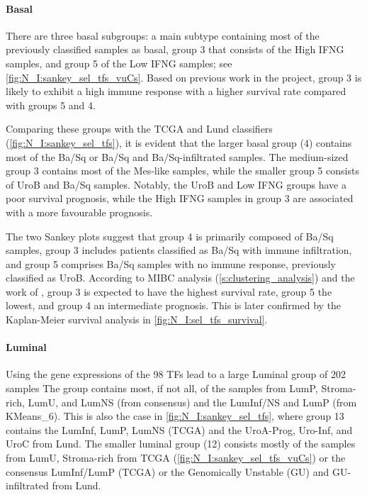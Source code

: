 \paragraph*{Basal}

There are three basal subgroups: a main subtype containing most of the previously classified samples as basal, group 3 that consists of the High IFNG samples, and group 5 of the Low IFNG samples; see \cref{fig:N_I:sankey_sel_tfs_vuCs}. Based on previous work in the project, group 3 is likely to exhibit a high immune response with a higher survival rate compared with groups 5 and 4.

Comparing these groups with the TCGA and Lund classifiers (\cref{fig:N_I:sankey_sel_tfs}), it is evident that the larger basal group (4) contains most of the Ba/Sq or Ba/Sq and Ba/Sq-infiltrated samples. The medium-sized group 3 contains most of the Mes-like samples, while the smaller group 5 consists of UroB and Ba/Sq samples. Notably, the UroB and Low IFNG groups have a poor survival prognosis, while the High IFNG samples in group 3 are associated with a more favourable prognosis.

The two Sankey plots suggest that group 4 is primarily composed of Ba/Sq samples, group 3 includes patients classified as Ba/Sq with immune infiltration, and group 5 comprises Ba/Sq samples with no immune response, previously classified as UroB. According to MIBC analysis (\cref{s:clustering_analysis}) and the work of \citet{Marzouka2018-ge}, group 3 is expected to have the highest survival rate, group 5 the lowest, and group 4 an intermediate prognosis. This is later confirmed by the Kaplan-Meier survival analysis in \cref{fig:N_I:sel_tfs_survival}.


\paragraph*{Luminal}

Using the gene expressions of the 98 TFs lead to a large Luminal group of 202 samples The group contains most, if not all, of the samples from LumP, Stroma-rich, LumU, and LumNS (from consensus) and the LumInf/NS and LumP (from KMeans\_6). This is also the case in \cref{fig:N_I:sankey_sel_tfs}, where group 13 contains the LumInf, LumP, LumNS (TCGA) and the UroA-Prog, Uro-Inf, and UroC from Lund. The smaller luminal group (12) consists mostly of the samples from LumU, Stroma-rich from TCGA (\cref{fig:N_I:sankey_sel_tfs_vuCs}) or the consensus LumInf/LumP (TCGA) or the Genomically Unstable (GU) and GU-infiltrated from Lund.


